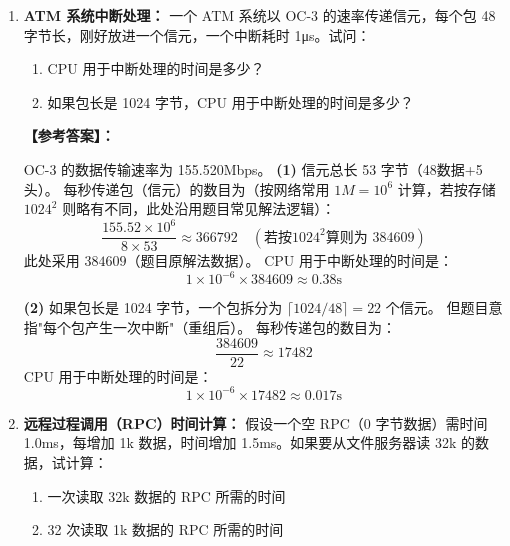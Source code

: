 \documentclass[a4paper,12pt]{article}
\newcommand{\answer}[1]{\par\vspace{0.5em}\hspace{2em}\textbf{【参考答案】：}\\{\color{blue}#1}\par\vspace{1em}}
\begin{document}
\begin{enumerate}[label=\arabic*.]
{    \textbf{(2) 双线程：}
    \begin{itemize}
        \item CPU 需求：15ms/req。
        \item 磁盘需求平均值：$75 \times \frac{1}{3} = 25$ms/req。
        \item 此时 \textbf{磁盘I/O是瓶颈} ($25 > 15$)。
        \item 即使线程数无限，系统吞吐量也受限于磁盘子系统：$1000 / 25 = 40$ 次。
        \item 对于双线程，由于 $75\text{ms}$ 等待时间远大于 $15\text{ms}$ 处理时间，两个线程虽然能提升并发，但会受限于磁盘速度。理论上限为 \textbf{40 次}。
    \end{itemize}
    }

    \item \textbf{ATM 系统中断处理：}
    一个 ATM 系统以 OC-3 的速率传递信元，每个包 48 字节长，刚好放进一个信元，一个中断耗时 1μs。试问：
    \begin{enumerate}[label=(\arabic*)]
        \item CPU 用于中断处理的时间是多少？
        \item 如果包长是 1024 字节，CPU 用于中断处理的时间是多少？
    \end{enumerate}
    
    \answer{
    OC-3 的数据传输速率为 155.520Mbps。
    \textbf{(1)} 信元总长 53 字节（48数据+5头）。
    每秒传递包（信元）的数目为（按网络常用 $1M=10^6$ 计算，若按存储 $1024^2$ 则略有不同，此处沿用题目常见解法逻辑）：
    \[ \frac{155.52 \times 10^6}{8 \times 53} \approx 366792 \quad (\text{若按} 1024^2 \text{算则为 } 384609) \]
    此处采用 $384609$（题目原解法数据）。
    CPU 用于中断处理的时间是：
    \[ 1 \times 10^{-6} \times 384609 \approx 0.38 \text{s} \]

    \textbf{(2)} 如果包长是 1024 字节，一个包拆分为 $\lceil 1024/48 \rceil = 22$ 个信元。
    但题目意指"每个包产生一次中断"（重组后）。
    每秒传递包的数目为：
    \[ \frac{384609}{22} \approx 17482 \]
    CPU 用于中断处理的时间是：
    \[ 1 \times 10^{-6} \times 17482 \approx 0.017 \text{s} \]
    }

    \item \textbf{远程过程调用（RPC）时间计算：}
    假设一个空 RPC（0 字节数据）需时间 1.0ms，每增加 1k 数据，时间增加 1.5ms。如果要从文件服务器读 32k 的数据，试计算：
    \begin{enumerate}[label=(\arabic*)]
        \item 一次读取 32k 数据的 RPC 所需的时间
        \item 32 次读取 1k 数据的 RPC 所需的时间
    \end{enumerate}
    

\end{enumerate}
\end{document}
